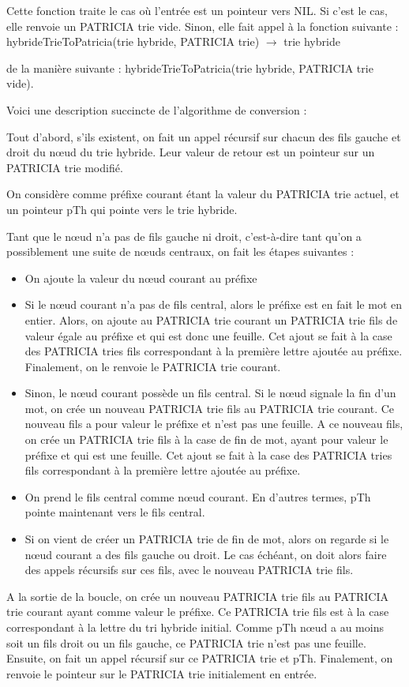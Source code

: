\documentclass[a4paper,12pt]{report}
\begin{document}
Cette fonction traite le cas où l'entrée est un pointeur vers NIL.
Si c'est le cas, elle renvoie un PATRICIA trie vide. Sinon, elle fait appel à la fonction suivante :
hybrideTrieToPatricia(trie hybride, PATRICIA trie) $\rightarrow$ trie hybride

de la manière suivante : hybrideTrieToPatricia(trie hybride, PATRICIA trie vide).

Voici une description succincte de l'algorithme de conversion :

Tout d'abord, s'ils existent, on fait un appel récursif sur chacun des fils gauche et droit du nœud du trie hybride. Leur valeur de retour est un pointeur sur un PATRICIA trie modifié.

On considère comme préfixe courant étant la valeur du PATRICIA trie actuel, et un pointeur pTh qui pointe vers le trie hybride.

Tant que le nœud n'a pas de fils gauche ni droit, c'est-à-dire tant qu'on a possiblement une suite de nœuds centraux, on fait les étapes suivantes :
\begin{itemize}
\item On ajoute la valeur du nœud courant au préfixe
\item Si le nœud courant n'a pas de fils central, alors le préfixe est en fait le mot en entier. Alors, on ajoute au PATRICIA trie courant un PATRICIA trie fils de valeur égale au préfixe et qui est donc une feuille. Cet ajout se fait à la case des PATRICIA tries fils correspondant à la première lettre ajoutée au préfixe. Finalement, on le renvoie le PATRICIA trie courant.
\item Sinon, le nœud courant possède un fils central.
Si le nœud signale la fin d'un mot, on crée un nouveau PATRICIA trie fils au PATRICIA trie courant. Ce nouveau fils a pour valeur le préfixe et n'est pas une feuille. A ce nouveau fils, on crée un PATRICIA trie fils à la case de fin de  mot, ayant pour valeur le préfixe et qui est une feuille. Cet ajout se fait à la case des PATRICIA tries fils correspondant à la première lettre ajoutée au préfixe.
\item On prend le fils central comme nœud courant. En d'autres termes, pTh pointe maintenant vers le fils central. 
\item Si on vient de créer un PATRICIA trie de fin de mot, alors on regarde si le nœud courant a des fils gauche ou droit. Le cas échéant, on doit alors faire des appels récursifs sur ces fils, avec le nouveau PATRICIA trie fils.
\end{itemize}
A la sortie de la boucle, on crée un nouveau PATRICIA trie fils au PATRICIA trie courant ayant comme valeur le préfixe. Ce PATRICIA trie fils est à la case correspondant à la lettre du tri hybride initial. Comme pTh nœud a au moins soit un fils droit ou un fils gauche, ce PATRICIA trie n'est pas une feuille. Ensuite, on fait un appel récursif sur ce PATRICIA trie et pTh.
Finalement, on renvoie le pointeur sur le PATRICIA trie initialement en entrée.
\end{document}
